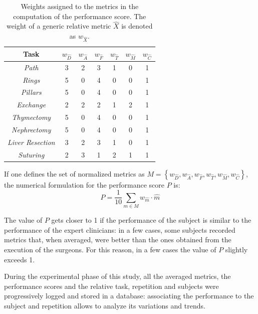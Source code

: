 \documentclass[../main.tex]{subfiles}
\begin{document}
\begin{table}
    \caption{Weights assigned to the metrics in the computation of the performance score. The weight of a generic relative metric $\hat{X}$ is denoted as $w_{\hat{X}}$.}
    \centering
    \begin{tabular}{||c||c|c|c|c|c|c||}
        \hline
        \textbf{Task} & $w_{\hat{D}}$ & $w_{\hat{A}}$ & $w_{\hat{F}}$ & $w_{\hat{T}}$ & $w_{\hat{M}}$ & $w_{\hat{C}}$ \\
        \hline\hline
        \textit{Path}            & 3 & 2 & 3 & 1 & 0 & 1 \\
        \hline
        \textit{Rings}           & 5 & 0 & 4 & 0 & 0 & 1 \\
        \hline
        \textit{Pillars}         & 5 & 0 & 4 & 0 & 0 & 1 \\
        \hline
        \textit{Exchange}        & 2 & 2 & 2 & 1 & 2 & 1 \\
        \hline
        \textit{Thymectomy}      & 5 & 0 & 4 & 0 & 0 & 1 \\
        \hline
        \textit{Nephrectomy}     & 5 & 0 & 4 & 0 & 0 & 1 \\
        \hline
        \textit{Liver Resection} & 3 & 2 & 3 & 1 & 0 & 1 \\
        \hline
        \textit{Suturing}        & 2 & 3 & 1 & 2 & 1 & 1 \\
        \hline
    \end{tabular}
    \label{tab:performanceweights}
\end{table} 

If one defines the set of normalized metrics as $M = \left\{ w_{\hat{D}}, w_{\hat{A}}, w_{\hat{F}}, w_{\hat{T}}, w_{\hat{M}}, w_{\hat{C}}\right\}$, the numerical formulation for the performance score $P$ is:
\begin{equation}
    P = \frac{1}{10}\sum_{m\in M} w_{\hat{m}}\cdot\hat{m}
    \label{eq:performance}
\end{equation}

The value of $P$ gets closer to 1 if the performance of the subject is similar to the performance of the expert clinicians: in a few cases, some subjects recorded metrics that, when averaged, were better than the ones obtained from the execution of the surgeons. For this reason, in a few cases the value of $P$ slightly exceeds 1.

During the experimental phase of this study, all the averaged metrics, the performance scores and the relative task, repetition and subjects were progressively logged and stored in a database: associating the performance to the subject and repetition allows to analyze its variations and trends.

% 
% 
\end{document}
